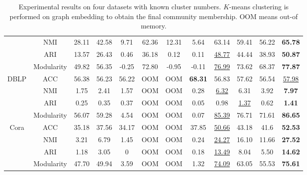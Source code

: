 \documentclass[letterpaper]{article} %
\begin{document}
\begin{table}[h]
\begin{center}
{\begin{tabular}{cc|ccc|ccc|ccc|c}
                            & NMI                      & 28.11       & 42.58      & 9.71       & 62.36    & 12.31 & 5.64           & 63.14       & 59.41       & 56.22      & \textbf{65.78} \\
                            & ARI                      & 13.57       & 26.43      & 0.46       & 36.18 & 0.12  & 0.11           & \underline{48.77}       & 44.44       & 38.93      & \textbf{50.87}    \\
                            & Modularity               & 49.82       & 56.35      & -0.25      & 72.80 & -0.95 & -0.11          & \underline{76.99}       & 73.62       & 68.37      & \textbf{77.87}    \\ \hline
\multirow{4}{*}{DBLP}       & ACC                      & 56.38       & 56.23      & 56.22      & OOM            & OOM   & \textbf{68.31} & 56.83       & 57.62       & 56.54      & \underline{57.98}    \\
                            & NMI                      & 1.75        & 2.41       & 1.57       & OOM            & OOM   & 0.28           & \underline{6.32}  & 6.31        & 3.92       & \textbf{7.97}  \\
                            & ARI                      & 0.25        & 0.35       & 0.37       & OOM            & OOM   & 0.05           & 0.98        & \underline{1.37}  & 0.62       & \textbf{1.41}  \\
                            & Modularity               & 56.07       & 59.28      & 4.54       & OOM            & OOM   & 0.07           & \underline{85.39} & 76.71       & 71.61      & \textbf{86.65} \\ \hline
\multirow{4}{*}{Cora}       & ACC                      & 35.18       & 37.56      & 34.17      & OOM            & OOM   & 37.85          & \underline{50.66} & 43.18       & 41.6       & \textbf{52.53} \\
                            & NMI                      & 3.21        & 6.79       & 1.45       & OOM            & OOM   & 0.24           & \underline{24.27} & 16.10        & 11.66      & \textbf{27.52} \\
                            & ARI                      & 1.18        & 3.05       & 0          & OOM            & OOM   & 0.18           & \underline{13.49} & 8.04        & 5.50        & \textbf{14.62} \\
                            & Modularity               & 47.70       & 49.94      & 3.59       & OOM            & OOM   & 1.32           & \underline{74.09} & 63.05       & 55.53      & \textbf{75.61} \\ \hline
\end{tabular}
}

\end{center}
\caption{Experimental results on four datasets with known cluster numbers. $K$-means clustering is performed on graph embedding to obtain the final community membership. OOM means out-of memory.}
\label{table:exp}
\end{table}
\end{document}
